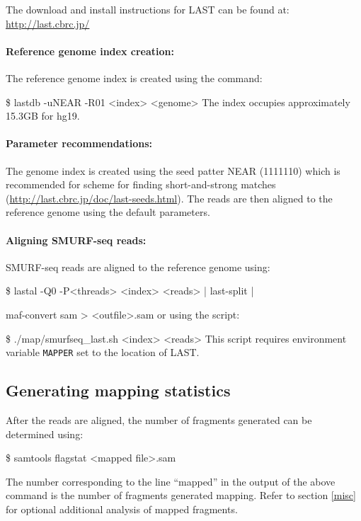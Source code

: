 \documentclass[11pt]{article}
\newenvironment{cmd}
{\list{}{
    \parsep=0em
    \itemindent=17pt
    \listparindent=50pt
    \leftmargin=0in
    \rightmargin=0in
  }\item[] \ttfamily \$}
{\endlist}
\begin{document}
The download and install instructions for LAST can be found at:
\url{http://last.cbrc.jp/}

\paragraph{Reference genome index creation:}
The reference genome index is created using the command:
\begin{cmd}
  lastdb -uNEAR -R01 <index> <genome>
\end{cmd}
The index occupies approximately 15.3GB for hg19.

\paragraph{Parameter recommendations:}
The genome index is created using the seed patter NEAR (1111110) which is
recommended for scheme for finding short-and-strong matches 
(\url{http://last.cbrc.jp/doc/last-seeds.html}). The reads are then aligned
to the reference genome using the default parameters. 

\paragraph{Aligning SMURF-seq reads:} 
SMURF-seq reads are aligned to the reference genome using:
\begin{cmd}
  lastal -Q0 -P<threads> <index> <reads> | last-split | 
    \par maf-convert sam > <outfile>.sam  
\end{cmd}
or using the script:
\begin{cmd}
  ./map/smurfseq\_last.sh <index> <reads> 
\end{cmd}
This script requires environment variable \texttt{MAPPER} set to the
location of LAST.




\subsection{Generating mapping statistics}
After the reads are aligned, the number of fragments generated can be 
determined using:
\begin{cmd}
  samtools flagstat <mapped file>.sam
\end{cmd}

The number corresponding to the line ``mapped'' in the output of the above
command is the number of fragments generated 
mapping. Refer to section \ref{misc} for optional additional analysis of
mapped fragments.
\end{document}
